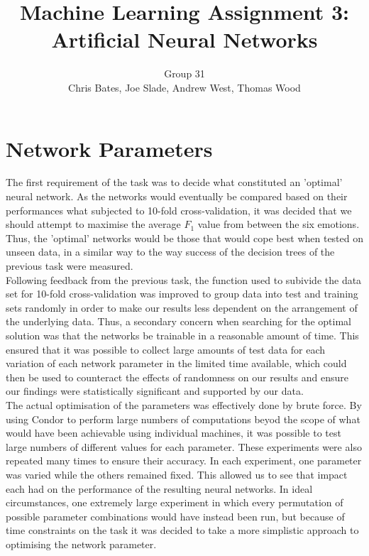 \documentclass[a4paper]{article}
\title{Machine Learning Assignment 3: Artificial Neural Networks}
\author{Group 31 \\ Chris Bates, Joe Slade, Andrew West, Thomas Wood}
\begin{document}
\maketitle
\section{Network Parameters}


The first requirement of the task was to decide what constituted an 'optimal' neural network. As the networks would eventually
be compared based on their performances what subjected to 10-fold cross-validation, it was decided that we should attempt to 
maximise the average $F_1$ value from between the six emotions. Thus, the 'optimal' networks would be those that would cope
best when tested on unseen data, in a similar way to the way success of the decision trees of the previous task were measured.\\

Following feedback from the previous task, the function used to subivide the data set for 10-fold cross-validation was improved
to group data into test and training sets randomly in order to make our results less dependent on the arrangement of the underlying data.
Thus, a secondary concern when searching for the optimal solution was that the networks be trainable in a reasonable amount of time.
This ensured that it was possible to collect large amounts of test data for each variation of each network parameter in the
limited time available, which could then be used to counteract the effects of randomness on our results and ensure our findings
were statistically significant and supported by our data.\\

The actual optimisation of the parameters was effectively done by brute force. By using Condor to perform large numbers of computations
beyod the scope of what would have been achievable using individual machines, it was possible to test large numbers of different values
for each parameter. These experiments were also repeated many times to ensure their accuracy. In each experiment, one parameter was varied
while the others remained fixed. This allowed us to see that impact each had on the performance of the resulting neural networks. In ideal
circumstances, one extremely large experiment in which every permutation of possible parameter combinations would have instead been run,
but because of time constraints on the task it was decided to take a more simplistic approach to optimising the network parameter.\\
\end{document}
